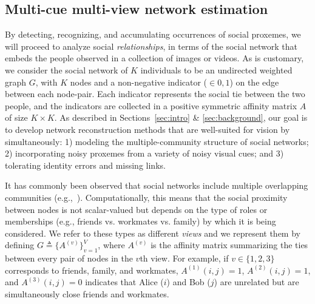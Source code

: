 
\subsection{Multi-cue multi-view network estimation}
\label{sec:vis2net}
\vspace{-5pt}

By detecting, recognizing, and accumulating occurrences of social proxemes, we will proceed to analyze social \emph{relationships}, in terms of the social network that embeds the people observed in a collection of images or videos. As is customary, we consider the social network of $K$ individuals to be an undirected weighted graph $G$, with $K$ nodes and a non-negative indicator ($\in {0,1}$) on the edge between each node-pair. Each indicator represents the social tie between the two people, and the indicators are collected in a positive symmetric affinity matrix $A$ of size $K\times K$. As described in Sections~\ref{sec:intro} \& \ref{sec:background}, our goal is to develop network reconstruction methods that are well-suited for vision by simultaneously: 1) modeling the multiple-community structure of social networks; 2) incorporating noisy proxemes from a variety of noisy visual cues; and 3) tolerating identity errors and missing links.

It has commonly been observed that social networks include multiple overlapping communities (e.g.,~\cite{AiroldiBFX08,Kim12}). Computationally, this means that the social proximity between nodes is not scalar-valued but depends on the type of roles or memberships (e.g., friends vs. workmates vs. family) by which it is being considered. We refer to these types as different \emph{views} and we represent them by defining $G\triangleq\{A^{(v)}\}_{v=1}^{V}$, where $A^{(v)}$ is the affinity matrix summarizing the ties between every pair of nodes in the $v$th view. For example, if $v\in\{1,2,3\}$ corresponds to friends, family, and workmates,  $A^{(1)}(i,j)=1$, $A^{(2)}(i,j)=1$, and $A^{(3)}(i,j)=0$ indicates that Alice ($i$) and Bob ($j$) are unrelated but are simultaneously close friends and workmates. 

